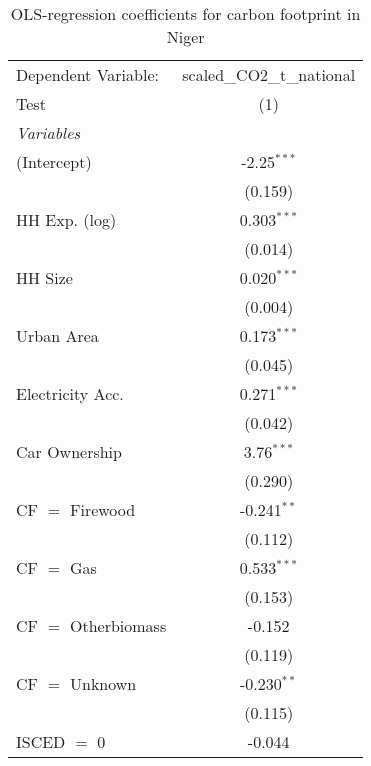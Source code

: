 
\begin{table}[htbp!]
   \centering
   \small
   \begin{adjustbox}{width = 1\textwidth, max height = 0.95\textheight, center}
      \begin{threeparttable}[b]
         \caption{\label{tab:OLS_2_NER} OLS-regression coefficients for carbon footprint in Niger}
         \begin{tabular}{lc}
            \tabularnewline \midrule \midrule
            Dependent Variable: & scaled\_CO2\_t\_national\\     
            Test                & (1)\\  
            \midrule
            \emph{Variables}\\
            (Intercept)         & -2.25$^{***}$\\   
                                & (0.159)\\   
            HH Exp. (log)       & 0.303$^{***}$\\   
                                & (0.014)\\   
            HH Size             & 0.020$^{***}$\\   
                                & (0.004)\\   
            Urban Area          & 0.173$^{***}$\\   
                                & (0.045)\\   
            Electricity Acc.    & 0.271$^{***}$\\   
                                & (0.042)\\   
            Car Ownership       & 3.76$^{***}$\\   
                                & (0.290)\\   
            CF $=$ Firewood     & -0.241$^{**}$\\   
                                & (0.112)\\   
            CF $=$ Gas          & 0.533$^{***}$\\   
                                & (0.153)\\   
            CF $=$ Otherbiomass & -0.152\\   
                                & (0.119)\\   
            CF $=$ Unknown      & -0.230$^{**}$\\   
                                & (0.115)\\   
            ISCED $=$ 0         & -0.044\\   

\end{tabular}
\end{threeparttable}
\end{adjustbox}
\end{table}

